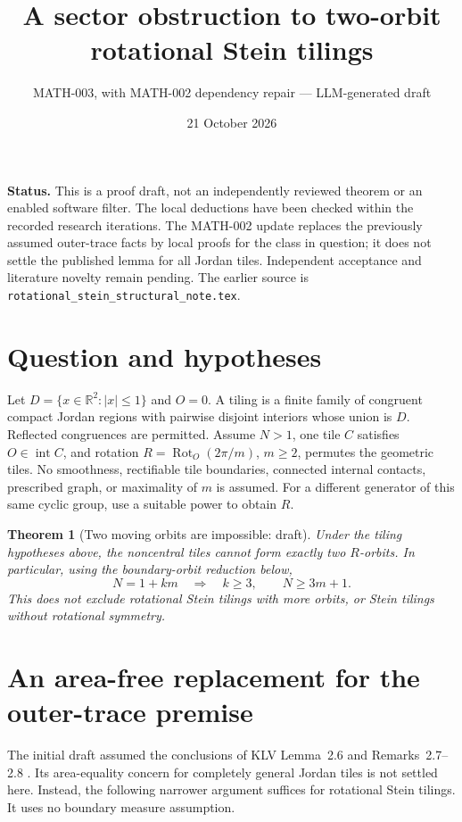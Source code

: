 \documentclass[11pt]{article}
\title{A sector obstruction to two-orbit rotational Stein tilings}
\author{MATH-003, with MATH-002 dependency repair --- LLM-generated draft}
\date{21 October 2026}
\newtheorem{theorem}{Theorem}
\newcommand{\interior}{\operatorname{int}}
\newcommand{\Rot}{\operatorname{Rot}}
\begin{document}
\maketitle

\noindent\textbf{Status.} This is a proof draft, not an independently reviewed
theorem or an enabled software filter. The local deductions have been checked
within the recorded research iterations. The MATH-002 update replaces the
previously assumed outer-trace facts by local proofs for the class in question;
it does not settle the published lemma for all Jordan tiles. Independent
acceptance and literature novelty remain pending. The
earlier source is \texttt{rotational\_stein\_structural\_note.tex}.

\section{Question and hypotheses}

Let $D=\{x\in\mathbb R^2:|x|\leq1\}$ and $O=0$. A tiling is a finite
family of congruent compact Jordan regions with pairwise disjoint interiors
whose union is $D$. Reflected congruences are permitted. Assume $N>1$, one tile
$C$ satisfies $O\in\interior C$, and rotation $R=\Rot_O(2\pi/m)$, $m\geq2$,
permutes the geometric tiles. No smoothness, rectifiable tile boundaries,
connected internal contacts, prescribed graph, or maximality of $m$ is assumed.
For a different generator of this same cyclic group, use a suitable power to
obtain $R$.

\begin{theorem}[Two moving orbits are impossible: draft]\label{thm:exclusion}
Under the tiling hypotheses above, the noncentral tiles cannot form exactly two
$R$-orbits. In particular, using the boundary-orbit reduction below,
\[
 N=1+km\quad\Longrightarrow\quad k\geq3,
 \qquad N\geq3m+1.
\]
This does not exclude rotational Stein tilings with more orbits, or Stein
tilings without rotational symmetry.
\end{theorem}

\section{An area-free replacement for the outer-trace premise}\label{sec:premises}

The initial draft assumed the conclusions of KLV Lemma~2.6 and
Remarks~2.7--2.8 \cite{KLV}. Its area-equality concern for completely general
Jordan tiles is not settled here. Instead, the following narrower argument
suffices for rotational Stein tilings. It uses no boundary measure assumption.
\end{document}
